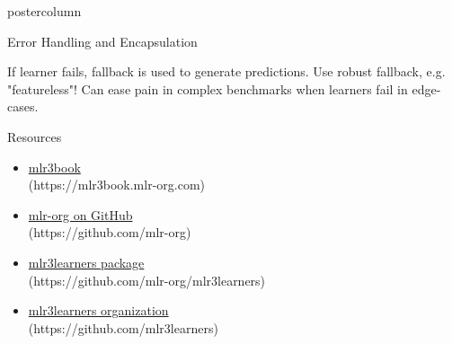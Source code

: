 \documentclass{beamer}
\begin{document}
\begin{withoutheader}
\begin{frame}[fragile]{}
\begin{columns}
\begin{column}{.245\textwidth}
\begin{beamercolorbox}[center]{postercolumn}
\begin{minipage}{.98\textwidth}
{\begin{myblock}{Error Handling and Encapsulation}
\begin{codebox}
							\end{codebox}
							If learner fails, fallback is used to generate predictions. 
                            Use robust fallback, e.g. "featureless"! Can ease pain in complex benchmarks when learners fail in edge-cases.
						\end{myblock}
						\begin{myblock}{Resources}
							\begin{itemize}
								\item \href{https://mlr3book.mlr-org.com/index.html}{mlr3book}\\ (https://mlr3book.mlr-org.com)
								\item \href{https://github.com/mlr-org}{mlr-org on GitHub}\\ (https://github.com/mlr-org)
								\item \href{https://github.com/mlr-org/mlr3learners}{mlr3learners package}\\ (https://github.com/mlr-org/mlr3learners)
								\item \href{https://github.com/mlr3learners}{mlr3learners organization}\\ (https://github.com/mlr3learners)
							\end{itemize}
						\end{myblock}
						\vfill
					}
				\end{minipage}
			\end{beamercolorbox}
		\end{column}
	\end{columns}
\end{frame}
\end{withoutheader}
\end{document}
